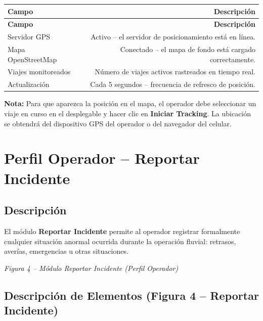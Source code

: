 \documentclass[12pt,a4paper]{article}
\begin{document}
\begin{longtable}{LR}
  \toprule
  \textbf{Campo} & \textbf{Descripción} \\
  \midrule
  \endfirsthead
  \toprule
  \textbf{Campo} & \textbf{Descripción} \\
  \midrule
  \endhead
  \bottomrule
  \endfoot
  Servidor GPS       & Activo -- el servidor de posicionamiento está en línea. \\[4pt]
  Mapa OpenStreetMap & Conectado -- el mapa de fondo está cargado correctamente. \\[4pt]
  Viajes monitoreados & Número de viajes activos rastreados en tiempo real. \\[4pt]
  Actualización      & Cada 5 segundos -- frecuencia de refresco de posición. \\
\end{longtable}

\begin{notabox}
\textbf{Nota:} Para que aparezca la posición en el mapa, el operador debe seleccionar un viaje en curso en el desplegable y hacer clic en \textbf{Iniciar Tracking}. La ubicación se obtendrá del dispositivo GPS del operador o del navegador del celular.
\end{notabox}

\section{Perfil Operador -- Reportar Incidente}

\subsection{Descripción}

El módulo \textbf{Reportar Incidente} permite al operador registrar formalmente cualquier situación anormal ocurrida durante la operación fluvial: retrasos, averías, emergencias u otras situaciones.

\textit{Figura 4 -- Módulo Reportar Incidente (Perfil Operador)}

\subsection{Descripción de Elementos (Figura 4 -- Reportar Incidente)}
\end{document}
